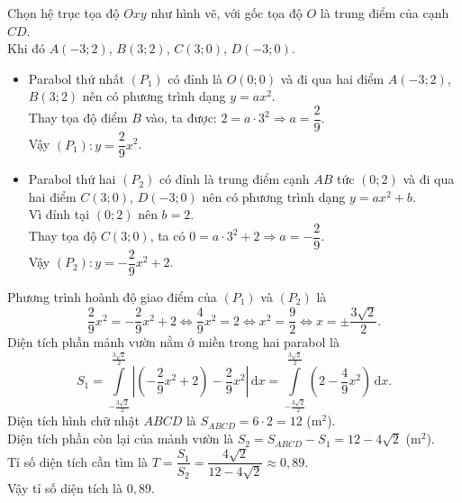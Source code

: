 \begin{ex}
{\begin{center}
\end{center}
Chọn hệ trục tọa độ $Oxy$ như hình vẽ, với gốc tọa độ $O$ là trung điểm của cạnh $CD$.\\
Khi đó $A(-3;2)$, $B(3;2)$, $C(3;0)$, $D(-3;0)$.
\begin{itemize}
\item Parabol thứ nhất $(P_1)$ có đỉnh là $O(0;0)$ và đi qua hai điểm $A(-3;2)$, $B(3;2)$ nên có phương trình dạng $y=ax^2$.\\
Thay tọa độ điểm $B$ vào, ta được: $2 = a \cdot 3^2 \Rightarrow a = \dfrac{2}{9}$.\\
Vậy $(P_1) \colon y = \dfrac{2}{9}x^2$.
\item Parabol thứ hai $(P_2)$ có đỉnh là trung điểm cạnh $AB$ tức $(0;2)$ và đi qua hai điểm $C(3;0)$, $ D(-3;0)$ nên có phương trình dạng $y=ax^2+b$.\\
Vì đỉnh tại $(0;2)$ nên $b=2$. \\
Thay tọa độ $C(3;0)$, ta có $0 = a \cdot 3^2 + 2 \Rightarrow a = -\dfrac{2}{9}$.\\
Vậy $(P_2)\colon y = -\dfrac{2}{9}x^2 + 2$.
\end{itemize}
Phương trình hoành độ giao điểm của $(P_1)$ và $(P_2)$ là
\[ \dfrac{2}{9}x^2=-\dfrac{2}{9}x^2 + 2 \Leftrightarrow \dfrac{4}{9}x^2=2\Leftrightarrow x^2 = \dfrac{9}{2} \Leftrightarrow x = \pm \dfrac{3\sqrt{2}}{2}.\]
Diện tích phần mảnh vườn nằm ở miền trong hai parabol là
\[ S_1 = \displaystyle\int\limits_{-\frac{3\sqrt{2}}{2}}^{\frac{3\sqrt{2}}{2}} \left| \left(-\dfrac{2}{9}x^2 + 2\right) - \dfrac{2}{9}x^2 \right| \mathrm{\,d}x = \displaystyle\int\limits_{-\frac{3\sqrt{2}}{2}}^{\frac{3\sqrt{2}}{2}} \left( 2 - \dfrac{4}{9}x^2 \right) \mathrm{\,d}x.\]
Diện tích hình chữ nhật $ABCD$ là $S_{ABCD} = 6 \cdot 2 = 12$ (m$^2$).\\
Diện tích phần còn lại của mảnh vườn là $S_2 = S_{ABCD} - S_1 = 12 - 4\sqrt{2}$ (m$^2$).\\
Tỉ số diện tích cần tìm là $ T = \dfrac{S_1}{S_2}=\dfrac{4\sqrt{2}}{12 - 4\sqrt{2}} \approx 0{,}89$.\\
Vậy tỉ số diện tích là $0{,}89$.
}
\end{ex}

